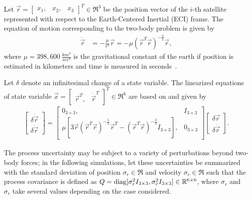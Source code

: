 Let $\vec r=\begin{bmatrix}x_1, & x_2, & x_3\end{bmatrix}^T\in\Re^3$ be the position vector of the $i$-th satellite represented with respect to the Earth-Centered Inertial (ECI) frame.
The equation of motion corresponding to the two-body problem is given by
\begin{align}
\label{eqn:NonLin2BP}
\ddot{\vec r}&=-\frac{\mu}{r^3}\vec r=-\mu(\vec r^T\vec r)^{-\frac32}\vec r,
\end{align}
where $\mu=398,600\ \frac{km^3}{sec^2}$ is the gravitational constant of the earth if position is estimated in kilometers and time is measured in seconds~\cite{Val01}.

Let $\delta$ denote an infinitesimal change of a state variable.
The linearized equations of state variable $\vec x=\begin{bmatrix}\vec r^T, & \dot{\vec r}^T\end{bmatrix}^T\in\Re^6$ are based on  and given by
\begin{align}
\begin{bmatrix}
\delta\dot{\vec r} \\ \delta\ddot{\vec r}
\end{bmatrix}
=
\begin{bmatrix}
0_{3\times3}, & I_{3\times3} \\
\mu\left[3\vec r({\vec r}^T\vec r)^{-\frac52}{\vec r}^T-({\vec r}^T\vec r)^{-\frac32}I_{3\times3}\right], & 0_{3\times3}
\end{bmatrix}
\begin{bmatrix}
\delta\vec r \\ \delta\dot{\vec r}
\end{bmatrix}
.
\end{align}

The process uncertainty may be subject to a variety of perturbations beyond two-body forces; in the following simulations, let these uncertainties be summarized with the standard deviation of position $\sigma_r\in\Re$ and velocity $\sigma_{\dot r}\in\Re$ such that the process covariance is defined as $Q=\mathop{\mathrm{diag}}\nolimits[\sigma_r^2I_{3\times3}, \sigma_{\dot r}^2I_{3\times3}]\in\mathbb{R}^{6\times6}$, where $\sigma_r$ and $\sigma_{\dot r}$ take several values depending on the case considered.

